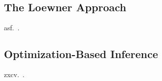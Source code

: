 \subsection{The Loewner Approach}\label{subsec:loewner-approach}

asf.~\cite{Antoulas2019, BGD2020, Cherifi2022, Peherstorfer2017, Poussot2022, GKA2021}.

\subsection{Optimization-Based Inference}\label{subsec:optimization-based-inference}

zxcv.~\cite{Gillis2018, Günther2023, Morandin2022, Najnudel2021, Schwerdtner2021, SV2021, Schwerdtner2022, Schwerdtner2023}.
